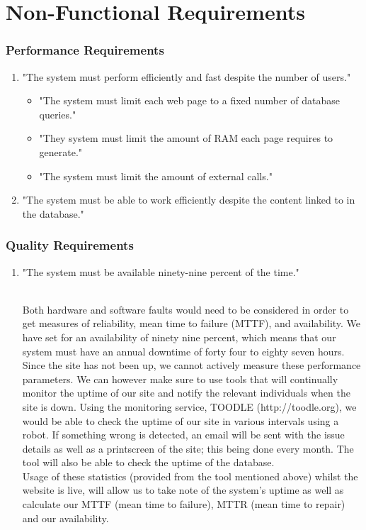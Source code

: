 \documentclass[12pt,a4paper]{article}
\begin{document}
	\section{Non-Functional Requirements}
		\subsubsection*{Performance Requirements}
			\begin{enumerate}
				\item "The system must perform efficiently and fast despite the number of users."
				\begin{itemize}
					\item  "The system must limit each web page to a fixed number of database queries."
					\item "They system must limit the amount of RAM each page requires to generate."
					\item "The system must limit the amount of external calls."
				\end{itemize}
				\item "The system must be able to work efficiently despite the content linked to in the database."
			\end{enumerate}
			\subsubsection*{Quality Requirements}
				\begin{enumerate}
					\item  "The system must be available ninety-nine percent of the time." \\\\
					\begin{scriptsize}Both hardware and software faults would need to be considered in order to get measures of reliability, mean time to failure (MTTF), and availability. We have set for an availability of ninety nine percent, which means that our system must have an annual downtime of forty four to eighty seven hours.\\ 

Since the site has not been up, we cannot actively measure these performance parameters. We can however make sure to use tools that will continually monitor the uptime of our site and notify the relevant individuals when the site is down. Using the monitoring service, TOODLE (http://toodle.org), we would be able to check the uptime of our site in various intervals using a robot. If something wrong is detected, an email will be sent with the issue details as well as a printscreen of the site; this being done every month. The tool will also be able to check the uptime of the database.\\

Usage of these statistics (provided from the tool mentioned above) whilst the website is live, will allow us to take note of the system's uptime as well as calculate our MTTF (mean time to failure), MTTR (mean time to repair) and our availability. 
\end{scriptsize}

				\end{enumerate}
				
\end{document}
